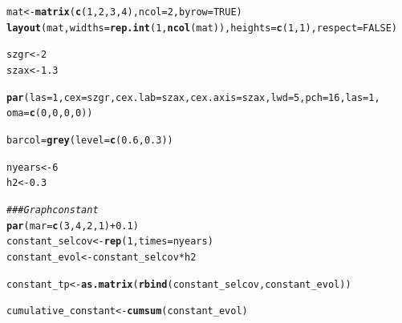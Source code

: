 \documentclass{article}\usepackage[]{graphicx}\usepackage[]{color}
\makeatletter
\newcommand{\hlnum}[1]{\textcolor[rgb]{0.686,0.059,0.569}{#1}}%
\newcommand{\hlcom}[1]{\textcolor[rgb]{0.678,0.584,0.686}{\textit{#1}}}%
\newcommand{\hlopt}[1]{\textcolor[rgb]{0,0,0}{#1}}%
\newcommand{\hlstd}[1]{\textcolor[rgb]{0.345,0.345,0.345}{#1}}%
\newcommand{\hlkwb}[1]{\textcolor[rgb]{0.69,0.353,0.396}{#1}}%
\newcommand{\hlkwc}[1]{\textcolor[rgb]{0.333,0.667,0.333}{#1}}%
\newcommand{\hlkwd}[1]{\textcolor[rgb]{0.737,0.353,0.396}{\textbf{#1}}}%
\newenvironment{kframe}{%
 \def\at@end@of@kframe{}%
 \ifinner\ifhmode%
  \def\at@end@of@kframe{\end{minipage}}%
  \begin{minipage}{\columnwidth}%
 \fi\fi%
 \def\FrameCommand##1{\hskip\@totalleftmargin \hskip-\fboxsep
 \colorbox{shadecolor}{##1}\hskip-\fboxsep
     \hskip-\linewidth \hskip-\@totalleftmargin \hskip\columnwidth}%
 \MakeFramed {\advance\hsize-\width
   \@totalleftmargin\z@ \linewidth\hsize
   \@setminipage}}%
 {\par\unskip\endMakeFramed%
 \at@end@of@kframe}
\newenvironment{knitrout}{}{} %
\makeatother
\begin{document}
\begin{knitrout}
\color{fgcolor}\begin{kframe}
\begin{alltt}
\hlstd{mat} \hlkwb{<-} \hlkwd{matrix}\hlstd{(}\hlkwd{c}\hlstd{(}\hlnum{1}\hlstd{,} \hlnum{2}\hlstd{,} \hlnum{3}\hlstd{,} \hlnum{4}\hlstd{),}\hlkwc{ncol} \hlstd{=} \hlnum{2}\hlstd{,} \hlkwc{byrow} \hlstd{=} \hlnum{TRUE}\hlstd{)}
\hlkwd{layout}\hlstd{(mat,} \hlkwc{widths} \hlstd{=} \hlkwd{rep.int}\hlstd{(}\hlnum{1}\hlstd{,} \hlkwd{ncol}\hlstd{(mat)),} \hlkwc{heights} \hlstd{=} \hlkwd{c}\hlstd{(}\hlnum{1}\hlstd{,}\hlnum{1}\hlstd{),} \hlkwc{respect} \hlstd{=} \hlnum{FALSE} \hlstd{)}

\hlstd{szgr} \hlkwb{<-} \hlnum{2}
\hlstd{szax} \hlkwb{<-} \hlnum{1.3}

\hlkwd{par}\hlstd{(}\hlkwc{las}\hlstd{=}\hlnum{1}\hlstd{,} \hlkwc{cex}\hlstd{=szgr,} \hlkwc{cex.lab}\hlstd{=szax ,} \hlkwc{cex.axis}\hlstd{=szax,} \hlkwc{lwd}\hlstd{=}\hlnum{5} \hlstd{,}\hlkwc{pch}\hlstd{=}\hlnum{16}\hlstd{,} \hlkwc{las}\hlstd{=}\hlnum{1}\hlstd{,}
    \hlkwc{oma}\hlstd{=}\hlkwd{c}\hlstd{(}\hlnum{0}\hlstd{,}\hlnum{0}\hlstd{,}\hlnum{0}\hlstd{,}\hlnum{0}\hlstd{))}

\hlstd{barcol} \hlkwb{=} \hlkwd{grey}\hlstd{(}\hlkwc{level} \hlstd{=} \hlkwd{c}\hlstd{(}\hlnum{0.6}\hlstd{,}\hlnum{0.3}\hlstd{))}

\hlstd{nyears} \hlkwb{<-} \hlnum{6}
\hlstd{h2} \hlkwb{<-} \hlnum{0.3}

\hlcom{### Graph constant}
\hlkwd{par}\hlstd{(}\hlkwc{mar}\hlstd{=}\hlkwd{c}\hlstd{(}\hlnum{3}\hlstd{,} \hlnum{4}\hlstd{,} \hlnum{2}\hlstd{,} \hlnum{1}\hlstd{)} \hlopt{+} \hlnum{0.1}\hlstd{)}
\hlstd{constant_selcov} \hlkwb{<-} \hlkwd{rep}\hlstd{(}\hlnum{1}\hlstd{,} \hlkwc{times}\hlstd{=nyears)}
\hlstd{constant_evol} \hlkwb{<-} \hlstd{constant_selcov} \hlopt{*} \hlstd{h2}

\hlstd{constant_tp} \hlkwb{<-} \hlkwd{as.matrix}\hlstd{(}\hlkwd{rbind}\hlstd{(constant_selcov, constant_evol))}

\hlstd{cumulative_constant} \hlkwb{<-} \hlkwd{cumsum}\hlstd{(constant_evol)}


\end{alltt}
\end{kframe}
\end{knitrout}
\end{document}

